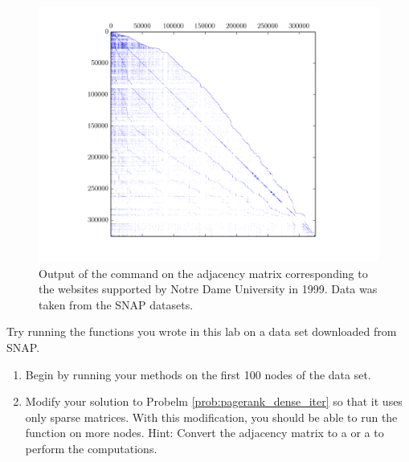 \begin{figure}
\centering
\includegraphics[width=\textwidth]{sparse_web.png}
\caption{Output of the  command on the adjacency matrix corresponding to the websites supported by Notre Dame University in 1999.
Data was taken from the SNAP datasets.}
\label{fig:WebSparse}
\end{figure}

\begin{problem}
Try running the functions you wrote in this lab on a data set downloaded from SNAP.
\begin{enumerate}
\item Begin by running your methods on the first 100 nodes of the data set.
\item Modify your solution to Probelm \ref{prob:pagerank_dense_iter} so that it uses only sparse matrices. 
With this modification, you should be able to run the function on more nodes.
Hint: Convert the adjacency matrix to a  or a  to perform the computations.
\end{enumerate}
\end{problem}
